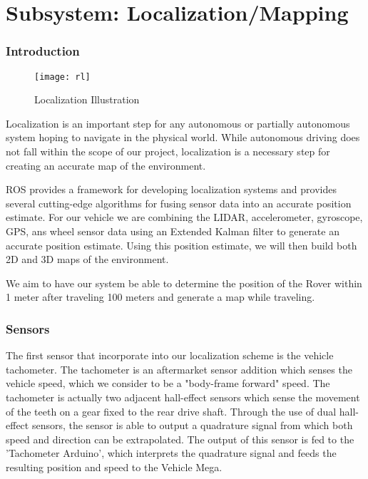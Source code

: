 \chapter{Subsystem: Localization/Mapping} \label{chap:Localization}

\subsection{Introduction}

\begin{figure}[H]
	\centerline{\texttt{[image: rl]}}
	\caption[]{Localization Illustration \cite{clearpath}}
	\label{fig:robotlocalization}
\end{figure}

Localization is an important step for any autonomous or partially autonomous system hoping to navigate in the physical world. While autonomous driving does not fall within the scope of our project, localization is a necessary step for creating an accurate map of the environment. 

ROS provides a framework for developing localization systems and provides several cutting-edge algorithms for fusing sensor data into an accurate position estimate. For our vehicle we are combining the LIDAR, accelerometer, gyroscope, GPS, ans wheel sensor data using an Extended Kalman filter to generate an accurate position estimate. Using this position estimate, we will then build both 2D and 3D maps of the environment. 

We aim to have our system be able to determine the position of the Rover within 1 meter after traveling 100 meters and generate a map while traveling.

\subsection{Sensors}



The first sensor that incorporate into our localization scheme is the vehicle tachometer. The tachometer is an aftermarket sensor addition which senses the vehicle speed, which we consider to be a "body-frame forward" speed. The tachometer is actually two adjacent hall-effect sensors which sense the movement of the teeth on a gear fixed to the rear drive shaft. Through the use of dual hall-effect sensors, the sensor is able to output a quadrature signal from which both speed and direction can be extrapolated. The output of this sensor is fed to the 'Tachometer Arduino', which interprets the quadrature signal and feeds the resulting position and speed to the Vehicle Mega.

